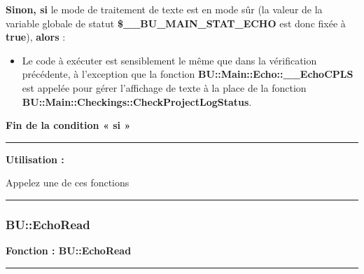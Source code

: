 \documentclass[a4paper,10pt]{article}
\begin{document}
\setlength{\parskip}{1em}

\begin{justify}
    \textbf{\color{cond}Sinon, si} le mode de traitement de texte est en mode sûr (la valeur de la variable globale de statut \textbf{\color{vars}\$\_\_BU\_MAIN\_STAT\_ECHO} est donc fixée à \textbf{true}), \textbf{\color{cond}alors} :

    \begin{itemize}
        \item
        {
            \begin{justify}
                Le code à exécuter est sensiblement le même que dans la vérification précédente, à l'exception que la fonction \textbf{\color{func}BU::Main::Echo::\_\_EchoCPLS} est appelée pour gérer l'affichage de texte à la place de la fonction \textbf{\color{func}BU::Main::Checkings::CheckProjectLogStatus}.
            \end{justify}
        }
    \end{itemize}
\end{justify}

\begin{justify}
    \textbf{\color{cond}Fin de la condition « si »}
\end{justify}


\par\noindent\rule{\textwidth}{0.4pt}

\begin{justify}
    \textbf{Utilisation :}

    Appelez une de ces fonctions
\end{justify}



\color{sec3}\par\noindent\rule{\textwidth}{0.4pt}\color{text}

\color{sec3}
\subsubsection{BU::EchoRead}\color{text}

\begin{justify}
    \textbf{Fonction : \color{func}BU::EchoRead}
\end{justify}


\par\noindent\rule{\textwidth}{0.4pt}
\end{document}
